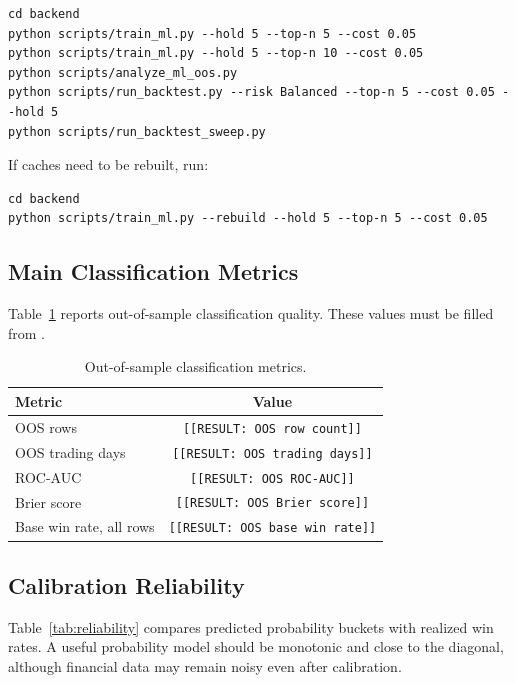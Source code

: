 \documentclass[11pt]{article}
\begin{document}
\begin{verbatim}
cd backend
python scripts/train_ml.py --hold 5 --top-n 5 --cost 0.05
python scripts/train_ml.py --hold 5 --top-n 10 --cost 0.05
python scripts/analyze_ml_oos.py
python scripts/run_backtest.py --risk Balanced --top-n 5 --cost 0.05 --hold 5
python scripts/run_backtest_sweep.py
\end{verbatim}

If caches need to be rebuilt, run:
\begin{verbatim}
cd backend
python scripts/train_ml.py --rebuild --hold 5 --top-n 5 --cost 0.05
\end{verbatim}

\subsection{Main Classification Metrics}

Table~\ref{tab:classification} reports out-of-sample classification quality.
These values must be filled from .

\begin{table}[ht]
\centering
\caption{Out-of-sample classification metrics.}
\label{tab:classification}
\begin{tabular}{lc}
\toprule
\textbf{Metric} & \textbf{Value} \\
\midrule
OOS rows & \texttt{[[RESULT: OOS row count]]} \\
OOS trading days & \texttt{[[RESULT: OOS trading days]]} \\
ROC-AUC & \texttt{[[RESULT: OOS ROC-AUC]]} \\
Brier score & \texttt{[[RESULT: OOS Brier score]]} \\
Base win rate, all rows & \texttt{[[RESULT: OOS base win rate]]} \\
\bottomrule
\end{tabular}
\end{table}

\subsection{Calibration Reliability}

Table~\ref{tab:reliability} compares predicted probability buckets with
realized win rates. A useful probability model should be monotonic and close to
the diagonal, although financial data may remain noisy even after calibration.
\end{document}

